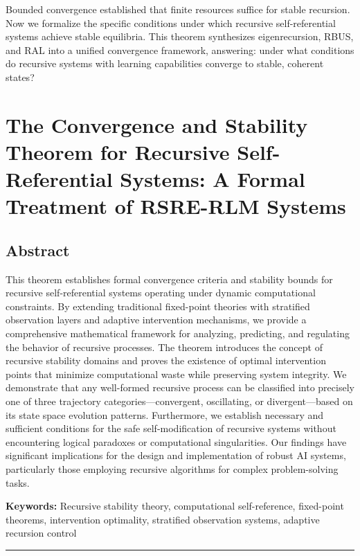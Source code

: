 \documentclass[
]{article}
\begin{document}
Bounded convergence established that finite resources suffice for stable
recursion. Now we formalize the specific conditions under which
recursive self-referential systems achieve stable equilibria. This
theorem synthesizes eigenrecursion, RBUS, and RAL into a unified
convergence framework, answering: under what conditions do recursive
systems with learning capabilities converge to stable, coherent states?

\section{The Convergence and Stability Theorem for Recursive
Self-Referential Systems: A Formal Treatment of RSRE-RLM
Systems}\label{the-convergence-and-stability-theorem-for-recursive-self-referential-systems-a-formal-treatment-of-rsre-rlm-systems}

\subsection{Abstract}\label{abstract-3}

This theorem establishes formal convergence criteria and stability
bounds for recursive self-referential systems operating under dynamic
computational constraints. By extending traditional fixed-point theories
with stratified observation layers and adaptive intervention mechanisms,
we provide a comprehensive mathematical framework for analyzing,
predicting, and regulating the behavior of recursive processes. The
theorem introduces the concept of recursive stability domains and proves
the existence of optimal intervention points that minimize computational
waste while preserving system integrity. We demonstrate that any
well-formed recursive process can be classified into precisely one of
three trajectory categories---convergent, oscillating, or
divergent---based on its state space evolution patterns. Furthermore, we
establish necessary and sufficient conditions for the safe
self-modification of recursive systems without encountering logical
paradoxes or computational singularities. Our findings have significant
implications for the design and implementation of robust AI systems,
particularly those employing recursive algorithms for complex
problem-solving tasks.

\textbf{Keywords:} Recursive stability theory, computational
self-reference, fixed-point theorems, intervention optimality,
stratified observation systems, adaptive recursion control

\begin{center}\rule{0.5\linewidth}{0.5pt}\end{center}
\end{document}
